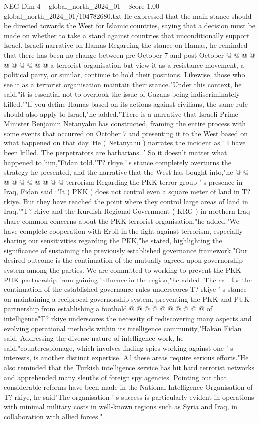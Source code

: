 \begin{textsample}{NEG Dim 4 – global\_north\_2024\_01 – Score 1.00 – global\_north\_2024\_01/104782680.txt}
He expressed that the main stance should be directed towards the West for Islamic countries, saying that a decision must be made on whether to take a stand against countries that unconditionally support Israel.
Israeli narrative on Hamas Regarding the stance on Hamas, he reminded that there has been no change between pre-October 7 and post-October @ @ @ @ @ @ @ @ @ @ a terrorist organisation but view it as a resistance movement, a political party, or similar, continue to hold their positions.
Likewise, those who see it as a terrorist organisation maintain their stance."Under this context, he said,"it is essential not to overlook the issue of Gazans being indiscriminately killed.""If you define Hamas based on its actions against civilians, the same rule should also apply to Israel,"he added."There is a narrative that Israeli Prime Minister Benjamin Netanyahu has constructed, framing the entire process with some events that occurred on October 7 and presenting it to the West based on what happened on that day.
He ( Netanyahu ) narrates the incident as ' I have been killed.
The perpetrators are barbarians. ' So it doesn't matter what happened to him,"Fidan told."T? rkiye ' s stance completely overturns the strategy he presented, and the narrative that the West has bought into,"he @ @ @ @ @ @ @ @ @ @ terrorism Regarding the PKK terror group ' s presence in Iraq, Fidan said :"It ( PKK ) does not control even a square meter of land in T? rkiye.
But they have reached the point where they control large areas of land in Iraq.""T? rkiye and the Kurdish Regional Government ( KRG ) in northern Iraq share common concerns about the PKK terrorist organisation,"he added."We have complete cooperation with Erbil in the fight against terrorism, especially sharing our sensitivities regarding the PKK,"he stated, highlighting the significance of sustaining the previously established governance framework."Our desired outcome is the continuation of the mutually agreed-upon governorship system among the parties.
We are committed to working to prevent the PKK-PUK partnership from gaining influence in the region,"he added.
The call for the continuation of the established governance rules underscores T? rkiye ' s stance on maintaining a reciprocal governorship system, preventing the PKK and PUK partnership from establishing a foothold @ @ @ @ @ @ @ @ @ @ of intelligence"T? rkiye underscores the necessity of rediscovering many aspects and evolving operational methods within its intelligence community,"Hakan Fidan said.
Addressing the diverse nature of intelligence work, he said,"counterespionage, which involves finding spies working against one ' s interests, is another distinct expertise.
All these areas require serious efforts."He also reminded that the Turkish intelligence service has hit hard terrorist networks and apprehended many sleuths of foreign spy agencies.
Pointing out that considerable reforms have been made in the National Intelligence Organisation of T? rkiye, he said"The organisation ' s success is particularly evident in operations with minimal military costs in well-known regions such as Syria and Iraq, in collaboration with allied forces."

\end{textsample}
